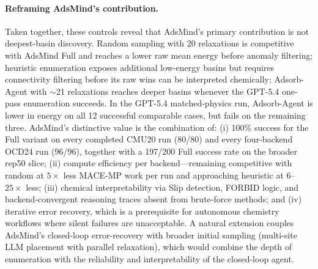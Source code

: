 \paragraph{Reframing AdsMind's contribution.}
Taken together, these controls reveal that AdsMind's primary contribution is not deepest-basin discovery.
Random sampling with 20 relaxations is competitive with AdsMind Full and reaches a lower raw mean energy before anomaly filtering; heuristic enumeration exposes additional low-energy basins but requires connectivity filtering before its raw wins can be interpreted chemically; Adsorb-Agent with $\sim$21 relaxations reaches deeper basins whenever the GPT-5.4 one-pass enumeration succeeds.
In the GPT-5.4 matched-physics run, Adsorb-Agent is lower in energy on all 12 successful comparable cases, but fails on the remaining three.
AdsMind's distinctive value is the combination of: (i) 100\% success for the Full variant on every completed CMU20 run (80/80) and every four-backend OCD24 run (96/96), together with a 197/200 Full success rate on the broader rep50 slice; (ii) compute efficiency per backend---remaining competitive with random at $5\times$ less MACE-MP work per run and approaching heuristic at $6$--$25\times$ less; (iii) chemical interpretability via Slip detection, FORBID logic, and backend-convergent reasoning traces absent from brute-force methods; and (iv) iterative error recovery, which is a prerequisite for autonomous chemistry workflows where silent failures are unacceptable.
A natural extension couples AdsMind's closed-loop error-recovery with broader initial sampling (multi-site LLM placement with parallel relaxation), which would combine the depth of enumeration with the reliability and interpretability of the closed-loop agent.

